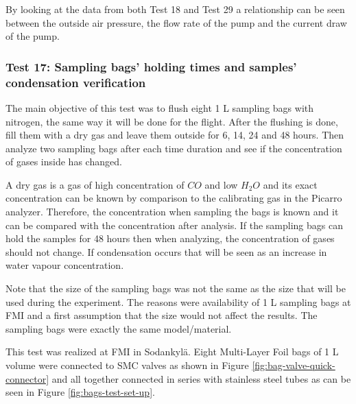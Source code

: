 By looking at the data from both Test 18 and Test 29 a relationship can be seen between the outside air pressure, the flow rate of the pump and the current draw of the pump. 

\subsubsection{Test 17: Sampling bags' holding times and samples' condensation verification}
\label{sec:test17result}

The main objective of this test was to flush eight 1 L sampling bags with nitrogen, the same way it will be done for the flight. After the flushing is done, fill them with a dry gas and leave them outside for 6, 14, 24 and 48 hours. Then analyze two sampling bags after each time duration and see if the concentration of gases inside has changed. 

A dry gas is a gas of high concentration of $CO$ and low $H_2O$ and its exact concentration can be known by comparison to the calibrating gas in the Picarro analyzer. Therefore, the concentration when sampling the bags is known and it can be compared with the concentration after analysis. If the sampling bags can hold the samples for 48 hours then when analyzing, the concentration of gases should not change. If condensation occurs that will be seen as an increase in water vapour concentration. 

Note that the size of the sampling bags was not the same as the size that will be used during the experiment. The reasons were availability of 1 L sampling bags at FMI and a first assumption that the size would not affect the results. The sampling bags were exactly the same model/material.


This test was realized at FMI in Sodankyl\"{a}. Eight Multi-Layer Foil bags of 1 L volume were connected to SMC valves as shown in Figure \ref{fig:bag-valve-quick-connector} and all together connected in series with stainless steel tubes as can be seen in Figure \ref{fig:bags-test-set-up}.

